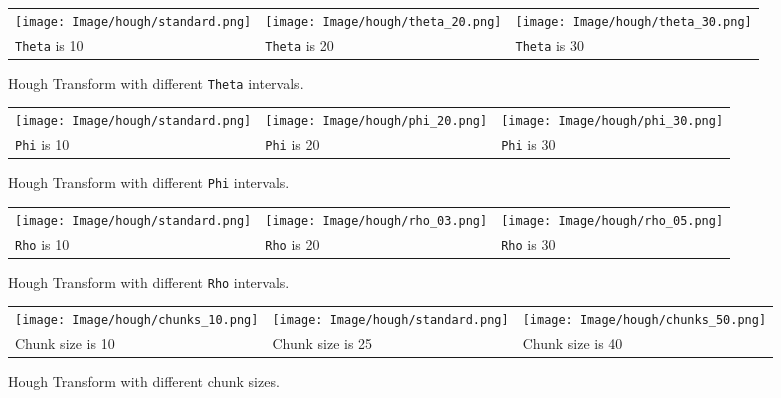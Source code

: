 \documentclass[a4paper,9pt]{article}
\begin{document}
\begin{figure}[H]
    \begin{tabularx}{\textwidth}{XXX}
        \texttt{[image: Image/hough/standard.png]} & 
        \texttt{[image: Image/hough/theta\_20.png]} & 
        \texttt{[image: Image/hough/theta\_30.png]} \\
        \verb|Theta| is 10 & \verb|Theta| is 20 & \verb|Theta| is 30
    \end{tabularx}
    \caption{Hough Transform with different \texttt{Theta} intervals.}
    \label{fig:hough_theta}
\end{figure}

\begin{figure}[H]
    \begin{tabularx}{\textwidth}{XXX}
        \texttt{[image: Image/hough/standard.png]} & 
        \texttt{[image: Image/hough/phi\_20.png]} & 
        \texttt{[image: Image/hough/phi\_30.png]} \\
        \verb|Phi| is 10 & \verb|Phi| is 20 & \verb|Phi| is 30
    \end{tabularx}
    \caption{Hough Transform with different \texttt{Phi} intervals.}
    \label{fig:hough_phi}
\end{figure}

\begin{figure}[H]
    \begin{tabularx}{\textwidth}{XXX}
        \texttt{[image: Image/hough/standard.png]} & 
        \texttt{[image: Image/hough/rho\_03.png]} & 
        \texttt{[image: Image/hough/rho\_05.png]} \\
        \verb|Rho| is 10 & \verb|Rho| is 20 & \verb|Rho| is 30
    \end{tabularx}
    \caption{Hough Transform with different \texttt{Rho} intervals.}
    \label{fig:hough_rho}
\end{figure}

\begin{figure}[H]
    \begin{tabularx}{\textwidth}{XXX}
        \texttt{[image: Image/hough/chunks\_10.png]} & 
        \texttt{[image: Image/hough/standard.png]} & 
        \texttt{[image: Image/hough/chunks\_50.png]} \\
        Chunk size is 10 & Chunk size is 25 & Chunk size is 40
    \end{tabularx}
    \caption{Hough Transform with different chunk sizes.}
    \label{fig:hough_chunk_count}
\end{figure}
\end{document}
